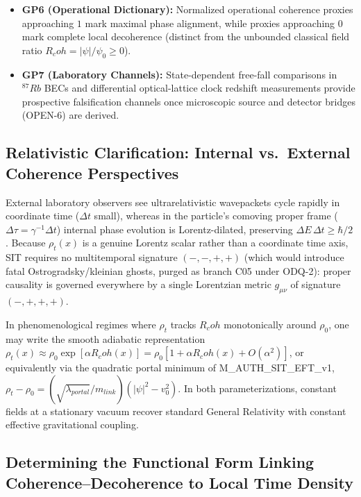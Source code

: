 \documentclass[american,11pt,letterpaper]{article}
\newcommand{\Rcoh}{R_{\mathrm{coh}}}
\def\mathrm#1{#1}%
\def\texttt#1{#1}%
\def\Rcoh{R_coh}%
\begin{document}
\begin{itemize}
  \item \textbf{GP6 (Operational Dictionary):} Normalized operational coherence proxies approaching $1$ mark maximal phase alignment, while proxies approaching $0$ mark complete local decoherence (distinct from the unbounded classical field ratio $\Rcoh = |\psi|/\psi_0 \ge 0$).
  \item \textbf{GP7 (Laboratory Channels):} State-dependent free-fall comparisons in $^{87}\mathrm{Rb}$ BECs and differential optical-lattice clock redshift measurements provide prospective falsification channels once microscopic source and detector bridges (\texttt{OPEN-6}) are derived.
\end{itemize}

\subsection{Relativistic Clarification: Internal vs.\ External Coherence Perspectives}

External laboratory observers see ultrarelativistic wavepackets cycle rapidly in coordinate time ($\Delta t$ small), whereas in the particle's comoving proper frame ($\Delta\tau = \gamma^{-1}\Delta t$) internal phase evolution is Lorentz-dilated, preserving $\Delta E\,\Delta t \ge \hbar/2$. Because $\rho_t(x)$ is a genuine Lorentz scalar rather than a coordinate time axis, SIT requires no multitemporal signature $(-, -, +, +)$ (which would introduce fatal Ostrogradsky/kleinian ghosts, purged as branch \texttt{C05} under \texttt{ODQ-2}): proper causality is governed everywhere by a single Lorentzian metric $g_{\mu\nu}$ of signature $(-,+,+,+)$.

In phenomenological regimes where $\rho_t$ tracks $\Rcoh$ monotonically around $\rho_0$, one may write the smooth adiabatic representation $\rho_t(x) \approx \rho_0\exp[\alpha\Rcoh(x)] = \rho_0[1 + \alpha\Rcoh(x) + O(\alpha^2)]$, or equivalently via the quadratic portal minimum of \texttt{M\_AUTH\_SIT\_EFT\_v1}, $\rho_t - \rho_0 = (\sqrt{\lambda_{\mathrm{portal}}}/m_{\mathrm{link}})(|\psi|^2 - v_0^2)$. In both parameterizations, constant fields at a stationary vacuum recover standard General Relativity with constant effective gravitational coupling.

\subsection{Determining the Functional Form Linking Coherence--Decoherence to Local Time Density}
\end{document}
